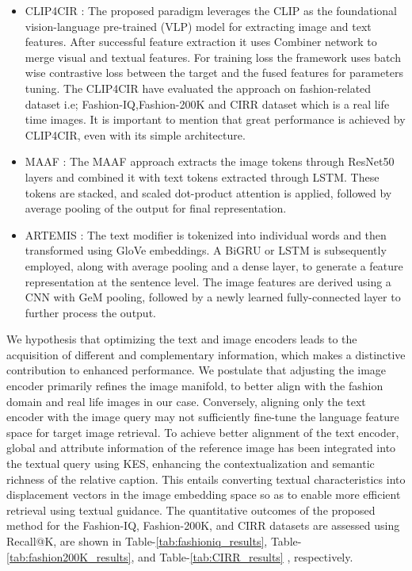 \documentclass[10pt,lineno]{wlpeerj}
\begin{document}
\begin{itemize}
    \item CLIP4CIR \citep{CLIP4CIR_Rev2}: The proposed paradigm leverages the CLIP as the foundational vision-language pre-trained (VLP) model for extracting image and text features. After successful feature extraction it uses Combiner network to merge visual and textual features. For training loss the framework uses batch wise contrastive loss between the target and the fused features for parameters tuning. The CLIP4CIR have evaluated the approach on fashion-related dataset i.e; Fashion-IQ,Fashion-200K and CIRR dataset which is a real life time images. It is important to mention that great performance is achieved by CLIP4CIR, even with its simple architecture.

\item MAAF \citep{MAAF}:
   The MAAF approach extracts the image tokens through ResNet50 layers and combined it with text tokens extracted through LSTM. These tokens are stacked, and scaled dot-product attention is applied, followed by average pooling of the output for final representation.

   \item ARTEMIS \citep{ARTEMIS}:
   The text modifier is tokenized into individual words and then transformed using GloVe embeddings. A BiGRU or LSTM is subsequently employed, along with average pooling and a dense layer, to generate a feature representation at the sentence level. The image features are derived using a CNN with GeM pooling, followed by a newly learned fully-connected layer to further process the output.
 
\end{itemize}
We hypothesis that optimizing the text and image encoders leads to the acquisition of different and complementary information, which makes a distinctive contribution to enhanced performance.
We postulate that adjusting the image encoder primarily refines the image manifold, to better align with the fashion domain and real life images in our case. Conversely, aligning only the text encoder with the image query may not sufficiently fine-tune the language feature space for target image retrieval. To achieve better alignment of the text encoder, global and attribute information of the reference image has been integrated into the textual query using KES, enhancing the contextualization and semantic richness of the relative caption. This entails converting textual characteristics into displacement vectors in the image embedding space so as to enable more efficient retrieval using textual guidance. The quantitative outcomes of the proposed method for the Fashion-IQ, Fashion-200K, and CIRR datasets are assessed using Recall@K, are shown in Table-\ref{tab:fashioniq_results}, Table-\ref{tab:fashion200K_results}, and Table-\ref{tab:CIRR_results} , respectively.
\end{document}
